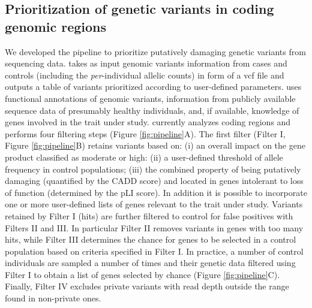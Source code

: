 \subsection*{Prioritization of genetic variants in coding genomic regions} 
We developed the \gp pipeline to prioritize putatively damaging genetic variants from sequencing data. \gp takes as input genomic variants information from cases and controls (including the \emph{per}-individual allelic counts) in form of a vcf file and outputs a table of variants prioritized according to user-defined parameters. \gp uses functional annotations of genomic variants, information from publicly available sequence data of presumably healthy individuals, and, if available, knowledge of genes involved in the trait under study. \gp currently analyzes coding regions and performs four filtering steps (Figure \ref{fig:pipeline}A). The first filter (Filter I, Figure \ref{fig:pipeline}B) retains variants based on: (i)  an overall impact on the gene product classified as moderate or high\cite{mclaren2016ensembl}: (ii) a user-defined threshold of allele frequency in control populations; (iii) the combined property of being putatively damaging (quantified by the CADD score\cite{rentzsch2019cadd}) and located in genes intolerant to loss of function (determined by the pLI score\cite{karczewski2020mutational}). In addition it is possible to incorporate one or more user-defined lists of genes relevant to the trait under study. Variants retained by Filter I (hits) are further filtered to control for false positives with Filters II and III. In particular Filter II removes variants in genes with too many hits, while Filter III determines the chance for genes to be selected in a control population based on criteria specified in Filter I. In practice, a number of control individuals are sampled a number of times and their genetic data filtered using Filter I to obtain a list of genes selected by chance (Figure \ref{fig:pipeline}C). Finally, Filter IV excludes private variants with read depth outside the range found in non-private ones.   



